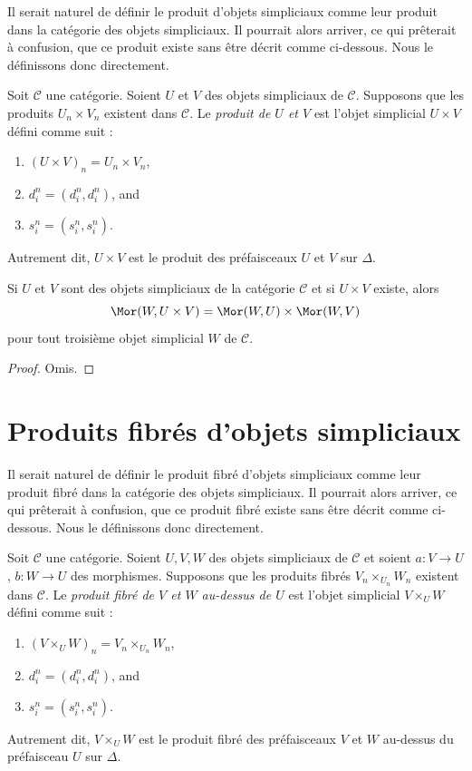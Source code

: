 \noindent
Il serait naturel de définir le produit d'objets simpliciaux comme leur
produit dans la catégorie des objets simpliciaux. Il pourrait alors arriver,
ce qui prêterait à confusion, que ce produit existe sans être décrit comme
ci-dessous. Nous le définissons donc directement.

\begin{definition}
\label{definition-product}
Soit $\mathcal{C}$ une catégorie. Soient $U$ et $V$ des objets simpliciaux
de $\mathcal{C}$. Supposons que les produits $U_n \times V_n$ existent
dans $\mathcal{C}$. Le {\it produit de $U$ et $V$} est l'objet simplicial
$U \times V$ défini comme suit :
\begin{enumerate}
\item $(U \times V)_n = U_n \times V_n$,
\item $d^n_i = (d^n_i, d^n_i)$, and
\item $s^n_i = (s^n_i, s^n_i)$.
\end{enumerate}
Autrement dit, $U \times V$ est le produit des préfaisceaux $U$ et $V$
sur $\Delta$.
\end{definition}

\begin{lemma}
\label{lemma-product}
Si $U$ et $V$ sont des objets simpliciaux de la catégorie $\mathcal{C}$
et si $U \times V$ existe, alors
$$
\Mor(W, U \times V) =
\Mor(W, U) \times
\Mor(W, V)
$$
pour tout troisième objet simplicial $W$ de $\mathcal{C}$.
\end{lemma}

\begin{proof}
Omis.
\end{proof}


\section{Produits fibrés d'objets simpliciaux}
\label{section-fibre-products}

\noindent
Il serait naturel de définir le produit fibré d'objets simpliciaux comme
leur produit fibré dans la catégorie des objets simpliciaux. Il pourrait
alors arriver, ce qui prêterait à confusion, que ce produit fibré existe
sans être décrit comme ci-dessous. Nous le définissons donc directement.

\begin{definition}
\label{definition-fibre-product}
Soit $\mathcal{C}$ une catégorie. Soient $U, V, W$ des objets simpliciaux
de $\mathcal{C}$ et soient $a : V \to U$, $b : W \to U$ des morphismes.
Supposons que les produits fibrés $V_n \times_{U_n} W_n$ existent dans
$\mathcal{C}$. Le {\it produit fibré de $V$ et $W$ au-dessus de $U$}
est l'objet simplicial $V \times_U W$ défini comme suit :
\begin{enumerate}
\item $(V \times_U W)_n = V_n \times_{U_n} W_n$,
\item $d^n_i = (d^n_i, d^n_i)$, and
\item $s^n_i = (s^n_i, s^n_i)$.
\end{enumerate}
Autrement dit, $V \times_U W$ est le produit fibré des préfaisceaux
$V$ et $W$ au-dessus du préfaisceau $U$ sur $\Delta$.
\end{definition}

